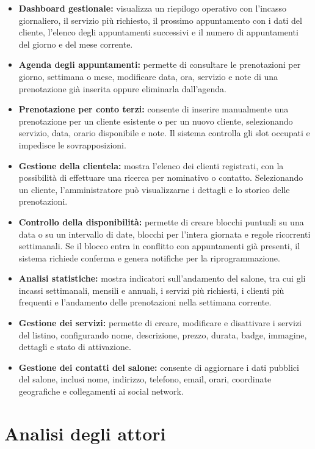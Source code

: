 \documentclass[12pt,a4paper]{article}
\begin{document}
\begin{itemize}
    \item \textbf{Dashboard gestionale:} visualizza un riepilogo operativo con l'incasso giornaliero, il servizio più richiesto, il prossimo appuntamento con i dati del cliente, l'elenco degli appuntamenti successivi e il numero di appuntamenti del giorno e del mese corrente.
    \item \textbf{Agenda degli appuntamenti:} permette di consultare le prenotazioni per giorno, settimana o mese, modificare data, ora, servizio e note di una prenotazione già inserita oppure eliminarla dall'agenda.
    \item \textbf{Prenotazione per conto terzi:} consente di inserire manualmente una prenotazione per un cliente esistente o per un nuovo cliente, selezionando servizio, data, orario disponibile e note. Il sistema controlla gli slot occupati e impedisce le sovrapposizioni.
    \item \textbf{Gestione della clientela:} mostra l'elenco dei clienti registrati, con la possibilità di effettuare una ricerca per nominativo o contatto. Selezionando un cliente, l'amministratore può visualizzarne i dettagli e lo storico delle prenotazioni.
    \item \textbf{Controllo della disponibilità:} permette di creare blocchi puntuali su una data o su un intervallo di date, blocchi per l'intera giornata e regole ricorrenti settimanali. Se il blocco entra in conflitto con appuntamenti già presenti, il sistema richiede conferma e genera notifiche per la riprogrammazione.
    \item \textbf{Analisi statistiche:} mostra indicatori sull'andamento del salone, tra cui gli incassi settimanali, mensili e annuali, i servizi più richiesti, i clienti più frequenti e l'andamento delle prenotazioni nella settimana corrente.
    \item \textbf{Gestione dei servizi:} permette di creare, modificare e disattivare i servizi del listino, configurando nome, descrizione, prezzo, durata, badge, immagine, dettagli e stato di attivazione.
    \item \textbf{Gestione dei contatti del salone:} consente di aggiornare i dati pubblici del salone, inclusi nome, indirizzo, telefono, email, orari, coordinate geografiche e collegamenti ai social network.
\end{itemize}

\newpage

\section{Analisi degli attori}
\end{document}
